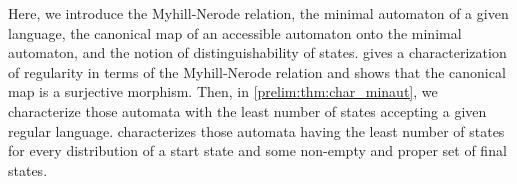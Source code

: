 
Here, we introduce the Myhill-Nerode relation,
the minimal automaton of a given language, the canonical map of
an accessible automaton onto the minimal automaton, and the notion of distinguishability of states.
 gives a characterization of regularity in terms of the Myhill-Nerode relation
and shows that the canonical map is a surjective morphism.
Then, in \cref{prelim:thm:char_minaut}, we characterize those automata
with the least number of states accepting a given regular language.
 characterizes those automata %
having the least number of states for every distribution of a start state and some non-empty and proper set of final states.

\label{def:Nerode}

